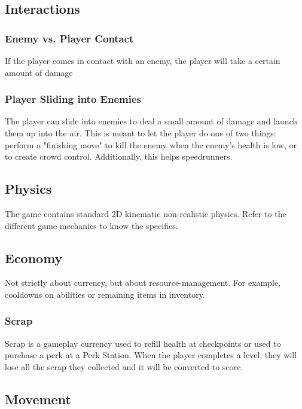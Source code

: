 \documentclass[12pt]{article}
\begin{document}
\subsection{Interactions}

\subsubsection{Enemy vs. Player Contact}

If the player comes in contact with an enemy, the player will take a certain amount of damage

\subsubsection{Player Sliding into Enemies}

The player can slide into enemies to deal a small amount of damage and launch them up into the air. This is meant to let the player do one of two things: perform a "finishing move" to kill the enemy when the enemy's health is low, or to create crowd control. Additionally, this helps speedrunners. 

\subsection{Physics}

The game contains standard 2D kinematic non-realistic physics. Refer to the different game mechanics to know the specifics.

\subsection{Economy}

Not strictly about currency, but about resource-management. For example, cooldowns on abilities or remaining items in inventory. 

\subsubsection{Scrap}

Scrap is a gameplay currency used to refill health at checkpoints or used to purchase a perk at a Perk Station. When the player completes a level, they will lose all the scrap they collected and it will be converted to score. 

\subsection{Movement}
\end{document}
